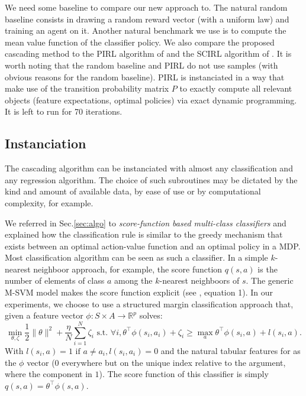 \documentclass[smallextended]{svjour3}
\begin{document}
We need some baseline to compare our new approach to. The natural random baseline consists in drawing a random reward vector (with a uniform law) and training an agent on it. Another natural benchmark we use is to compute the mean value function of the classifier policy. We also compare the proposed cascading method to the PIRL algorithm of \cite{abbeel2004apprenticeship} and the SCIRL algorithm of \cite{klein2012scirl}. It is worth noting that the random baseline and PIRL do not use samples (with obvious reasons for the random baseline). PIRL is instanciated in a way that make use of the transition probability matrix $P$ to exactly compute all relevant objects (feature expectations, optimal policies) via exact dynamic programming. It is left to run for 70 iterations.
\subsection{Instanciation}
\label{subsec:instanciation}
The cascading algorithm can be instanciated with almost any classification and any regression algorithm. The choice of such subroutines may be dictated by the kind and amount of available data, by ease of use or by computational complexity, for example.

We referred in Sec.\ref{sec:algo} to \emph{score-function based multi-class classifiers} and explained how the classification rule is similar to the greedy mechanism that exists between an optimal action-value function and an optimal policy in a MDP. Most classification algorithm can be seen as such a classifier. In a simple $k$-nearest neighboor approach, for example, the score function $q(s,a)$ is the number of elements of class $a$ among the $k$-nearest neighboors of $s$. The generic M-SVM model makes the score function explicit (see \cite{guermeur2011generic}, equation 1). In our experiments, we choose to use a structured margin classification approach \cite{taskar2005learning} that, given a feature vector $\phi : S\times A \rightarrow \mathbb{R}^p$ solves:
\begin{equation}
  \min_{\theta,\zeta}\frac{1}{2}\|\theta\|^2 +
  \frac{\eta}{N}\sum_{i=1}^N \zeta_i \text{~s.t.~} \forall i,
  \theta^\top{\phi}(s_i,a_i)+\zeta_i \geq \max_a \theta^\top
  {\phi}(s_i,a) + l(s_i,a). \label{eq:qp_taskar}
\end{equation}
With $l(s_i,a) = 1\textrm{ if } a\neq a_i,l(s_i,a_i)=0$ and the natural tabular features for as the $\phi$ vector ($0$ everywhere but on the unique index relative to the argument, where the component in $1$). The score function of this classifier is simply $q(s,a) = \theta^\top \phi(s,a)$. 
\end{document}

